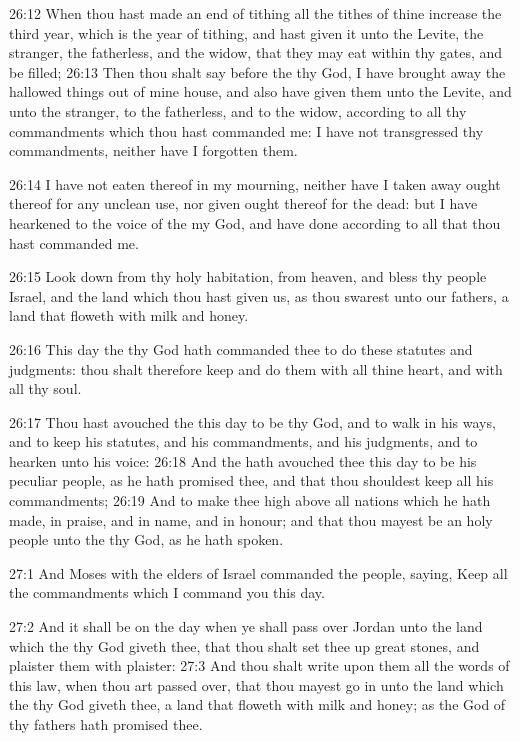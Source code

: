 26:12 When thou hast made an end of tithing all the tithes of thine increase the third year, which is the year of tithing, and hast given it unto the Levite, the stranger, the fatherless, and the widow, that they may eat within thy gates, and be filled; 26:13 Then thou shalt say before the \LORD thy God, I have brought away the hallowed things out of mine house, and also have given them unto the Levite, and unto the stranger, to the fatherless, and to the widow, according to all thy commandments which thou hast commanded me: I have not transgressed thy commandments, neither have I forgotten them.

26:14 I have not eaten thereof in my mourning, neither have I taken away ought thereof for any unclean use, nor given ought thereof for the dead: but I have hearkened to the voice of the \LORD my God, and have done according to all that thou hast commanded me.

26:15 Look down from thy holy habitation, from heaven, and bless thy people Israel, and the land which thou hast given us, as thou swarest unto our fathers, a land that floweth with milk and honey.

26:16 This day the \LORD thy God hath commanded thee to do these statutes and judgments: thou shalt therefore keep and do them with all thine heart, and with all thy soul.

26:17 Thou hast avouched the \LORD this day to be thy God, and to walk in his ways, and to keep his statutes, and his commandments, and his judgments, and to hearken unto his voice: 26:18 And the \LORD hath avouched thee this day to be his peculiar people, as he hath promised thee, and that thou shouldest keep all his commandments; 26:19 And to make thee high above all nations which he hath made, in praise, and in name, and in honour; and that thou mayest be an holy people unto the \LORD thy God, as he hath spoken.

27:1 And Moses with the elders of Israel commanded the people, saying, Keep all the commandments which I command you this day.

27:2 And it shall be on the day when ye shall pass over Jordan unto the land which the \LORD thy God giveth thee, that thou shalt set thee up great stones, and plaister them with plaister: 27:3 And thou shalt write upon them all the words of this law, when thou art passed over, that thou mayest go in unto the land which the \LORD thy God giveth thee, a land that floweth with milk and honey; as the \LORD God of thy fathers hath promised thee.

